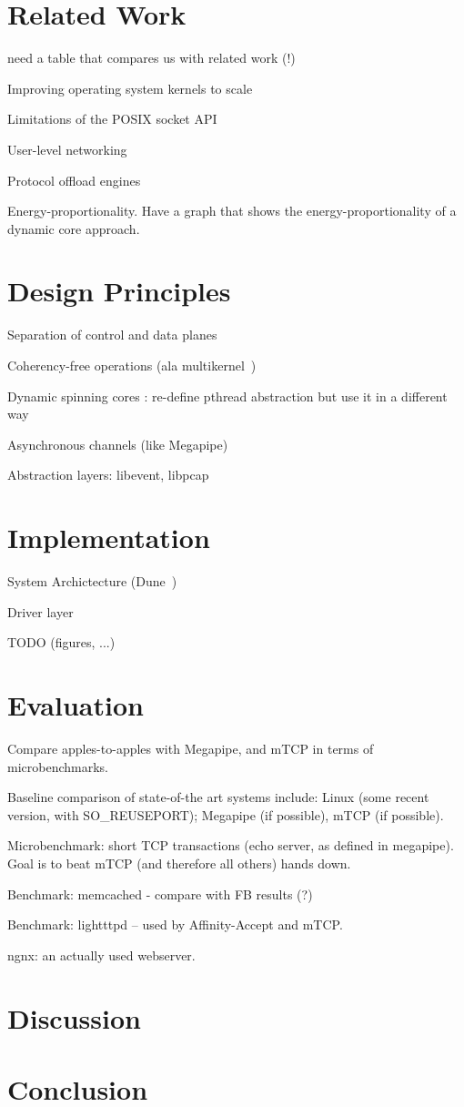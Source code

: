 


\section{Related Work}

\todo need a table that compares us with related work (!)

\todo Improving operating system kernels to scale

\todo Limitations of the POSIX socket API

\todo User-level networking

\todo Protocol offload engines

\todo Energy-proportionality.   Have a graph that shows the energy-proportionality of a dynamic core approach.


\section{Design Principles}

\todo Separation of control and data planes

\todo Coherency-free operations  (ala multikernel~\cite{DBLP:conf/sosp/BaumannBDHIPRSS09})

\todo Dynamic spinning cores : re-define pthread abstraction but use it in a different way

\todo Asynchronous channels (like Megapipe)

\todo Abstraction layers: libevent, libpcap


\section{Implementation}

\todo System Archictecture (Dune~\cite{belay2012dune})

\todo Driver layer

\todo TODO (figures, ...)

\section{Evaluation}


\todo Compare apples-to-apples with Megapipe, and mTCP in terms of microbenchmarks.

\todo Baseline comparison of state-of-the art systems include:  Linux (some recent version, with SO\_REUSEPORT); Megapipe (if possible), mTCP (if possible). 

\todo Microbenchmark: short TCP transactions (echo server, as defined in megapipe).   Goal is to beat mTCP (and therefore all others) hands down.

\todo Benchmark: memcached - compare with FB results (?)

\todo Benchmark: lightttpd -- used by Affinity-Accept and mTCP.  

\todo ngnx: an actually used webserver.


\section{Discussion}
\section{Conclusion}




